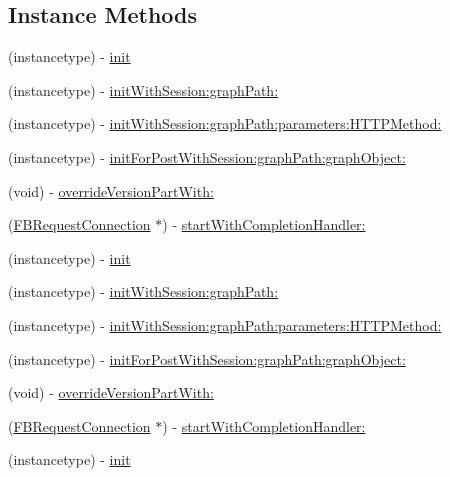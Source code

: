\subsection*{Instance Methods}
\begin{DoxyCompactItemize}
\item 
(instancetype) -\/ \hyperlink{interfaceFBRequest_a9e753030844abe92959a169b508f0a2b}{init}
\item 
(instancetype) -\/ \hyperlink{interfaceFBRequest_abf08647708e28e2fe5422e90680bd9dc}{init\+With\+Session\+:graph\+Path\+:}
\item 
(instancetype) -\/ \hyperlink{interfaceFBRequest_a4710201ef3004494a71f530a36df3e0b}{init\+With\+Session\+:graph\+Path\+:parameters\+:\+H\+T\+T\+P\+Method\+:}
\item 
(instancetype) -\/ \hyperlink{interfaceFBRequest_a9cf5a9bb6a0d519efb2127ffeb0da2e8}{init\+For\+Post\+With\+Session\+:graph\+Path\+:graph\+Object\+:}
\item 
(void) -\/ \hyperlink{interfaceFBRequest_a96f27df0edb3e41045bf5ba9ede2431c}{override\+Version\+Part\+With\+:}
\item 
(\hyperlink{interfaceFBRequestConnection}{F\+B\+Request\+Connection} $\ast$) -\/ \hyperlink{interfaceFBRequest_a40af16a9b68d4e08abd9e022b94df6f0}{start\+With\+Completion\+Handler\+:}
\item 
(instancetype) -\/ \hyperlink{interfaceFBRequest_a9e753030844abe92959a169b508f0a2b}{init}
\item 
(instancetype) -\/ \hyperlink{interfaceFBRequest_abf08647708e28e2fe5422e90680bd9dc}{init\+With\+Session\+:graph\+Path\+:}
\item 
(instancetype) -\/ \hyperlink{interfaceFBRequest_a4710201ef3004494a71f530a36df3e0b}{init\+With\+Session\+:graph\+Path\+:parameters\+:\+H\+T\+T\+P\+Method\+:}
\item 
(instancetype) -\/ \hyperlink{interfaceFBRequest_a9cf5a9bb6a0d519efb2127ffeb0da2e8}{init\+For\+Post\+With\+Session\+:graph\+Path\+:graph\+Object\+:}
\item 
(void) -\/ \hyperlink{interfaceFBRequest_a96f27df0edb3e41045bf5ba9ede2431c}{override\+Version\+Part\+With\+:}
\item 
(\hyperlink{interfaceFBRequestConnection}{F\+B\+Request\+Connection} $\ast$) -\/ \hyperlink{interfaceFBRequest_a40af16a9b68d4e08abd9e022b94df6f0}{start\+With\+Completion\+Handler\+:}
\item 
(instancetype) -\/ \hyperlink{interfaceFBRequest_a9e753030844abe92959a169b508f0a2b}{init}
\item 

\end{DoxyCompactItemize}
